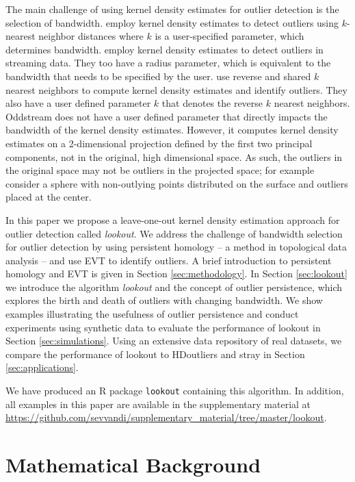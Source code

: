 \documentclass[11pt,a4paper,]{article}
\theoremstyle{definition}
\theoremstyle{definition}
\theoremstyle{definition}
\theoremstyle{remark}
\begin{document}
The main challenge of using kernel density estimates for outlier detection is the selection of bandwidth. \textcite{Schubert2014} employ kernel density estimates to detect outliers using \(k\)-nearest neighbor distances where \(k\) is a user-specified parameter, which determines bandwidth. \textcite{Qin2019} employ kernel density estimates to detect outliers in streaming data. They too have a radius parameter, which is equivalent to the bandwidth that needs to be specified by the user. \textcite{Tang2017} use reverse and shared \(k\) nearest neighbors to compute kernel density estimates and identify outliers. They also have a user defined parameter \(k\) that denotes the reverse \(k\) nearest neighbors. Oddstream \autocite{talagala2019anomaly} does not have a user defined parameter that directly impacts the bandwidth of the kernel density estimates. However, it computes kernel density estimates on a 2-dimensional projection defined by the first two principal components, not in the original, high dimensional space. As such, the outliers in the original space may not be outliers in the projected space; for example consider a sphere with non-outlying points distributed on the surface and outliers placed at the center.

In this paper we propose a leave-one-out kernel density estimation approach for outlier detection called \emph{lookout}. We address the challenge of bandwidth selection for outlier detection by using persistent homology -- a method in topological data analysis -- and use EVT to identify outliers. A brief introduction to persistent homology and EVT is given in Section \ref{sec:methodology}. In Section \ref{sec:lookout} we introduce the algorithm \textit{lookout} and the concept of outlier persistence, which explores the birth and death of outliers with changing bandwidth. We show examples illustrating the usefulness of outlier persistence and conduct experiments using synthetic data to evaluate the performance of lookout in Section \ref{sec:simulations}. Using an extensive data repository of real datasets, we compare the performance of lookout to HDoutliers and stray in Section \ref{sec:applications}.

We have produced an R package \texttt{lookout} \autocite{lookoutR} containing this algorithm. In addition, all examples in this paper are available in the supplementary material at \url{https://github.com/sevvandi/supplementary_material/tree/master/lookout}.

\hypertarget{mathematical-background}{%
\section{\texorpdfstring{Mathematical Background \label{sec:methodology}}{Mathematical Background }}\label{mathematical-background}}
\end{document}
